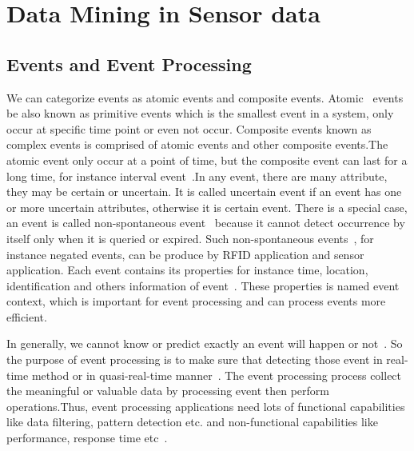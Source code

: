 \documentclass{report}
\begin{document}
\section{Data Mining in Sensor data}
\subsection{Events and Event Processing}


We can categorize events as atomic events and composite events. Atomic~\cite{chakravarthy1994composite} events be also known as primitive events which is the smallest event in a system, only occur at specific time point or even not occur. Composite events known as complex events is comprised of atomic events and other composite events.The atomic event only occur at a point of time, but the composite event can last for a long time, for instance interval event~\cite{chakravarthy1994snoop}.In any event, there are many attribute, they may be certain or uncertain. It is called uncertain event if an event has one or more uncertain attributes, otherwise it is certain event. There is a special case, an event is called non-spontaneous event~\cite{garofalakis2006probabilistic} because it cannot detect occurrence by itself only when it is queried or expired. Such non-spontaneous events~\cite{wang2006bridging}, for instance negated events, can be produce by RFID application and sensor application. Each event contains its properties for instance time, location, identification and others information of event~\cite{aggarwal2013managing}. These properties is named event context, which is important for event processing and can process events more efficient.


In generally, we cannot know or predict exactly an event will happen or not~\cite{chandy2009event}. So the purpose of event processing is to make sure that detecting those event in real-time method or in quasi-real-time manner~\cite{aggarwal2013managing}. The event processing process collect the meaningful or valuable data by processing event then perform operations.Thus, event processing applications need lots of functional capabilities like data filtering, pattern detection etc. and non-functional capabilities like performance, response time etc~\cite{aggarwal2013managing}.
\end{document}
